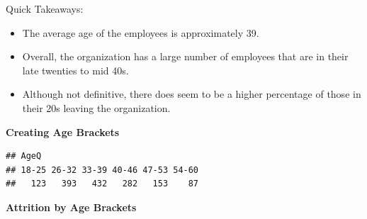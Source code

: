 \documentclass[
]{article}
\newenvironment{Shaded}{\begin{snugshade}}{\end{snugshade}}
\newcommand{\DataTypeTok}[1]{\textcolor[rgb]{0.13,0.29,0.53}{#1}}
\newcommand{\DecValTok}[1]{\textcolor[rgb]{0.00,0.00,0.81}{#1}}
\newcommand{\KeywordTok}[1]{\textcolor[rgb]{0.13,0.29,0.53}{\textbf{#1}}}
\newcommand{\NormalTok}[1]{#1}
\newcommand{\OperatorTok}[1]{\textcolor[rgb]{0.81,0.36,0.00}{\textbf{#1}}}
\newcommand{\StringTok}[1]{\textcolor[rgb]{0.31,0.60,0.02}{#1}}
\providecommand{\tightlist}{%
  \setlength{\itemsep}{0pt}\setlength{\parskip}{0pt}}
\begin{document}
Quick Takeaways:

\begin{itemize}
\tightlist
\item
  The average age of the employees is approximately 39.
\item
  Overall, the organization has a large number of employees that are in
  their late twenties to mid 40s.
\item
  Although not definitive, there does seem to be a higher percentage of
  those in their 20s leaving the organization.
\end{itemize}

\textbf{Creating Age Brackets}

\begin{Shaded}
\end{Shaded}

\begin{verbatim}
## AgeQ
## 18-25 26-32 33-39 40-46 47-53 54-60 
##   123   393   432   282   153    87
\end{verbatim}

\textbf{Attrition by Age Brackets}
\end{document}
